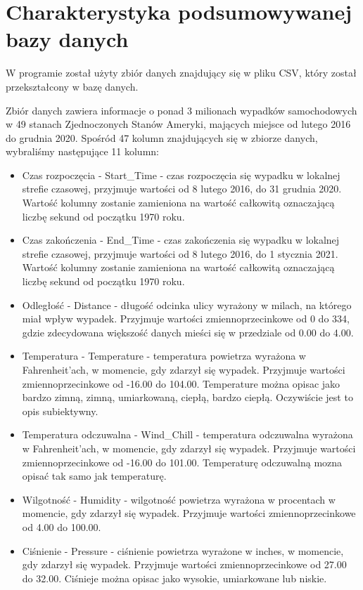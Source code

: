 \documentclass{classrep}
\begin{document}
\section{Charakterystyka podsumowywanej bazy danych}
W programie został użyty zbiór danych\cite{dane} znajdujący się w pliku CSV, który został przekształcony w bazę danych. 

Zbiór danych zawiera informacje o ponad 3 milionach wypadków samochodowych w 49 stanach Zjednoczonych Stanów Ameryki, mających miejsce od lutego 2016 do grudnia 2020. Spośród 47 kolumn znajdujących się w zbiorze danych, wybraliśmy następujące 11 kolumn:
\begin{itemize}
\item Czas rozpoczęcia - Start\_Time - czas rozpoczęcia się wypadku w lokalnej strefie czasowej, przyjmuje wartości od 8 lutego 2016, do 31 grudnia 2020. Wartość kolumny zostanie zamieniona na wartość całkowitą oznaczającą liczbę sekund od początku 1970 roku.
\item Czas zakończenia - End\_Time - czas zakończenia się wypadku w lokalnej strefie czasowej, przyjmuje wartości od 8 lutego 2016, do 1 stycznia 2021. Wartość kolumny zostanie zamieniona na wartość całkowitą oznaczającą liczbę sekund od początku 1970 roku. 
\item Odległość - Distance - długość odcinka ulicy wyrażony w milach, na którego miał wpływ wypadek. Przyjmuje wartości zmiennoprzecinkowe od 0 do 334, gdzie zdecydowana większość danych mieści się w przedziale od 0.00 do 4.00. 
\item Temperatura - Temperature - temperatura powietrza wyrażona w Fahrenheit'ach, w momencie, gdy zdarzył się wypadek.  Przyjmuje wartości zmiennoprzecinkowe od -16.00 do 104.00.  Temperature można opisac jako bardzo zimną, zimną, umiarkowaną, ciepłą, bardzo ciepłą. Oczywiście jest to opis subiektywny.
\item Temperatura odczuwalna - Wind\_Chill - temperatura odczuwalna wyrażona w Fahrenheit'ach, w momencie, gdy zdarzył się wypadek.  Przyjmuje wartości zmiennoprzecinkowe od -16.00 do 101.00. Temperaturę odczuwalną mozna opisać tak samo jak temperaturę.
\item Wilgotność - Humidity - wilgotność powietrza wyrażona w procentach w momencie, gdy zdarzył się wypadek. Przyjmuje wartości zmiennoprzecinkowe od 4.00 do 100.00. 
\item Ciśnienie - Pressure - ciśnienie powietrza wyrażone w inches, w momencie, gdy zdarzył się wypadek. Przyjmuje wartości zmiennoprzecinkowe od 27.00 do 32.00. Ciśnieje można opisac jako wysokie, umiarkowane lub niskie. 

\end{itemize}
\end{document}

